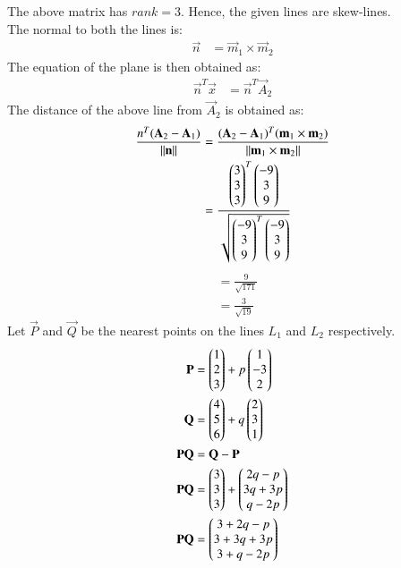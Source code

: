 \documentclass[journal,12pt,twocolumn]{IEEEtran}
\begin{document}
The above matrix has $rank = 3$. Hence, the given lines are skew-lines.\\
The normal to both the lines is:
\begin{align}
    \vec{n} &= \vec{m}_1 \times \vec{m}_2
\end{align}
The equation of the plane is then obtained as:
\begin{align}
    \vec{n}^T\vec{x} &= \vec{n}^T\vec{A}_2
\end{align}
The distance of the above line from $\vec{A}_2$ is obtained as:
\begin{align}
    \frac{n^T(\mathbf{A}_2 - \mathbf{A}_1)}{\lVert\mathbf{n}\rVert} &= \frac{(\mathbf{A}_2 - \mathbf{A}_1)^T(\mathbf{m}_1 \times \mathbf{m}_2)}{\lVert\mathbf{m}_1 \times \mathbf{m}_2\rVert}\\
    &= \frac{\begin{pmatrix}3\\3\\3\end{pmatrix}^T\begin{pmatrix}-9\\3\\9\end{pmatrix}}{\sqrt{\begin{pmatrix}-9\\3\\9\end{pmatrix}^T\begin{pmatrix}-9\\3\\9\end{pmatrix}}}
\end{align}
\begin{align}
    &= \frac{9}{\sqrt{171}}\\
    &= \frac{3}{\sqrt{19}}
\end{align}
Let $\vec{P}$ and $\vec{Q}$ be the nearest points on the lines $L_1$ and $L_2$ respectively.
\begin{align}
    \mathbf{P} &= \begin{pmatrix}1\\2\\3\end{pmatrix} + p \begin{pmatrix}1\\-3\\2\end{pmatrix}\\
    \mathbf{Q} &= \begin{pmatrix}4\\5\\6\end{pmatrix} + q \begin{pmatrix}2\\3\\1\end{pmatrix}\\
    \mathbf{PQ} &= \mathbf{Q} - \mathbf{P}\\
    \mathbf{PQ} &= \begin{pmatrix}3\\3\\3\end{pmatrix} + \begin{pmatrix} 2q-p\\ 3q + 3p\\ q - 2p\end{pmatrix}\\
    \mathbf{PQ} &= \begin{pmatrix}3 + 2q- p \\ 3+3q +3p \\ 3 + q - 2p\end{pmatrix}
\end{align}
\end{document}
